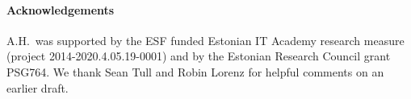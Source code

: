 \documentclass[submission]{eptcs}
\begin{document}
    \paragraph*{\bf Acknowledgements}
        A.H.\ was supported by the ESF funded Estonian IT Academy research measure (project 2014-2020.4.05.19-0001) and by the Estonian Research Council grant PSG764.
        We thank Sean Tull and Robin Lorenz for helpful comments on an earlier draft.

    
    
    
    
    
    

	\nocite{*}
	
	

    
\end{document}
